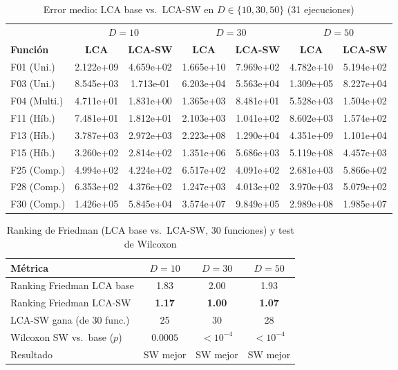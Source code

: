 \begin{table}[h!]
\centering
\caption{Error medio: LCA base vs.\ LCA-SW en $D \in \{10,30,50\}$ (31 ejecuciones)}
\label{tab:comp_sw}
\footnotesize
\renewcommand{\arraystretch}{1.2}
\begin{tabular}{@{}lcccccc@{}}
\toprule
& \multicolumn{2}{c}{\textbf{$D=10$}} & \multicolumn{2}{c}{\textbf{$D=30$}} & \multicolumn{2}{c}{\textbf{$D=50$}} \\
\cmidrule(lr){2-3}\cmidrule(lr){4-5}\cmidrule(lr){6-7}
\textbf{Función} & \textbf{LCA} & \textbf{LCA-SW} & \textbf{LCA} & \textbf{LCA-SW} & \textbf{LCA} & \textbf{LCA-SW} \\
\midrule
F01 (Uni.)   & 2.122e+09 & 4.659e+02 & 1.665e+10 & 7.969e+02 & 4.782e+10 & 5.194e+02 \\
F03 (Uni.)   & 8.545e+03 & 1.713e-01 & 6.203e+04 & 5.563e+04 & 1.309e+05 & 8.227e+04 \\
F04 (Multi.) & 4.711e+01 & 1.831e+00 & 1.365e+03 & 8.481e+01 & 5.528e+03 & 1.504e+02 \\
F11 (Híb.)   & 7.481e+01 & 1.812e+01 & 2.103e+03 & 1.041e+02 & 8.602e+03 & 1.574e+02 \\
F13 (Híb.)   & 3.787e+03 & 2.972e+03 & 2.223e+08 & 1.290e+04 & 4.351e+09 & 1.101e+04 \\
F15 (Híb.)   & 3.260e+02 & 2.814e+02 & 1.351e+06 & 5.686e+03 & 5.119e+08 & 4.457e+03 \\
F25 (Comp.)  & 4.994e+02 & 4.224e+02 & 6.517e+02 & 4.091e+02 & 2.681e+03 & 5.866e+02 \\
F28 (Comp.)  & 6.353e+02 & 4.376e+02 & 1.247e+03 & 4.013e+02 & 3.970e+03 & 5.079e+02 \\
F30 (Comp.)  & 1.426e+05 & 5.845e+04 & 3.574e+07 & 9.849e+05 & 2.989e+08 & 1.985e+07 \\
\bottomrule
\end{tabular}
\end{table}

\begin{table}[h!]
\centering
\caption{Ranking de Friedman (LCA base vs.\ LCA-SW, 30 funciones) y test de Wilcoxon}
\label{tab:sw_stats}
\renewcommand{\arraystretch}{1.3}
\begin{tabular}{@{}lccc@{}}
\toprule
\textbf{Métrica} & \textbf{$D=10$} & \textbf{$D=30$} & \textbf{$D=50$} \\
\midrule
Ranking Friedman LCA base & 1.83 & 2.00 & 1.93 \\
Ranking Friedman LCA-SW   & \textbf{1.17} & \textbf{1.00} & \textbf{1.07} \\
LCA-SW gana (de 30 func.) & 25 & 30 & 28 \\
Wilcoxon SW vs.\ base ($p$) & $0.0005$ & $<10^{-4}$ & $<10^{-4}$ \\
Resultado & SW mejor & SW mejor & SW mejor \\
\bottomrule
\end{tabular}
\end{table}

